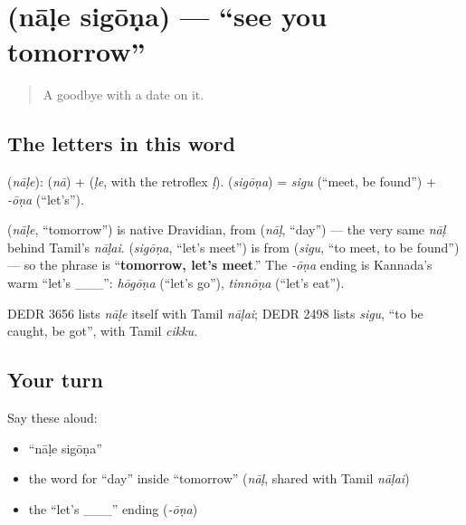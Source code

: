 \section[\texorpdfstring{\kn{ನಾಳೆ} \kn{ಸಿಗೋಣ} (nāḷe sigōṇa)}{ನಾಳೆ ಸಿಗೋಣ (nāḷe sigōṇa)}]{  (nāḷe sigōṇa) — \textquotedblleft{}see you tomorrow\textquotedblright{}}

\label{lesson:KA-C04-naale-sigona}



\begin{quote}
A goodbye with a date on it.
\end{quote}

\subsection*{The letters in this word}
\textbf{} (\emph{nāḷe}): \textbf{} (\emph{nā}) + \textbf{} (\emph{ḷe}, with the retroflex \textbf{} \emph{ḷ}). \textbf{} (\emph{sigōṇa}) = \emph{sigu} (\textquotedblleft{}meet, be found\textquotedblright{}) + \emph{-ōṇa} (\textquotedblleft{}let's\textquotedblright{}).

\begin{cousinweb}
\textbf{} (\emph{nāḷe}, \textquotedblleft{}tomorrow\textquotedblright{}) is native Dravidian, from \textbf{} (\emph{nāḷ}, \textquotedblleft{}day\textquotedblright{}) — the very same \emph{nāḷ} behind Tamil's \emph{nāḷai}. \textbf{} (\emph{sigōṇa}, \textquotedblleft{}let's meet\textquotedblright{}) is from \textbf{} (\emph{sigu}, \textquotedblleft{}to meet, to be found\textquotedblright{}) — so the phrase is \textquotedblleft{}\textbf{tomorrow, let's meet}.\textquotedblright{} The \emph{-ōṇa} ending is Kannada's warm \textquotedblleft{}let's \_\_\_\textquotedblright{}: \emph{hōgōṇa} (\textquotedblleft{}let's go\textquotedblright{}), \emph{tinnōṇa} (\textquotedblleft{}let's eat\textquotedblright{}).

DEDR 3656 lists \emph{nāḷe} itself with Tamil \emph{nāḷai}; DEDR 2498 lists \emph{sigu}, \textquotedblleft{}to be caught, be got\textquotedblright{}, with Tamil \emph{cikku}.
\end{cousinweb}

\subsection*{Your turn}
Say these aloud:

\begin{itemize}
\raggedright
  \item \textquotedblleft{}nāḷe sigōṇa\textquotedblright{}
  \item the word for \textquotedblleft{}day\textquotedblright{} inside \textquotedblleft{}tomorrow\textquotedblright{} (\emph{nāḷ}, shared with Tamil \emph{nāḷai})
  \item the \textquotedblleft{}let's \_\_\_\textquotedblright{} ending (\emph{-ōṇa})
\end{itemize}

